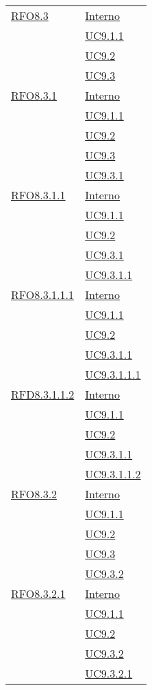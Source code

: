 \begin{longtable}{|>{\centering}m{5cm}|m{5cm}<{\centering}|}
\hyperlink{RFO8.3}{RFO8.3} & \hyperlink{Interno}{Interno}\\
& \hyperref[UC9.1.1]{UC9.1.1}\\
& \hyperref[UC9.2]{UC9.2}\\
& \hyperref[UC9.3]{UC9.3}\\ \hline

\hyperlink{RFO8.3.1}{RFO8.3.1} & \hyperlink{Interno}{Interno}\\
& \hyperref[UC9.1.1]{UC9.1.1}\\
& \hyperref[UC9.2]{UC9.2}\\
& \hyperref[UC9.3]{UC9.3}\\
& \hyperref[UC9.3.1]{UC9.3.1}\\ \hline

\hyperlink{RFO8.3.1.1}{RFO8.3.1.1} & \hyperlink{Interno}{Interno}\\
& \hyperref[UC9.1.1]{UC9.1.1}\\
& \hyperref[UC9.2]{UC9.2}\\
& \hyperref[UC9.3.1]{UC9.3.1}\\
& \hyperref[UC9.3.1.1]{UC9.3.1.1}\\ \hline

\hyperlink{RFO8.3.1.1.1}{RFO8.3.1.1.1} & \hyperlink{Interno}{Interno}\\
& \hyperref[UC9.1.1]{UC9.1.1}\\
& \hyperref[UC9.2]{UC9.2}\\
& \hyperref[UC9.3.1.1]{UC9.3.1.1}\\
& \hyperref[UC9.3.1.1.1]{UC9.3.1.1.1}\\ \hline

\hyperlink{RFD8.3.1.1.2}{RFD8.3.1.1.2} & \hyperlink{Interno}{Interno}\\
& \hyperref[UC9.1.1]{UC9.1.1}\\
& \hyperref[UC9.2]{UC9.2}\\
& \hyperref[UC9.3.1.1]{UC9.3.1.1}\\
& \hyperref[UC9.3.1.1.2]{UC9.3.1.1.2}\\ \hline

\hyperlink{RFO8.3.2}{RFO8.3.2} & \hyperlink{Interno}{Interno}\\
& \hyperref[UC9.1.1]{UC9.1.1}\\
& \hyperref[UC9.2]{UC9.2}\\
& \hyperref[UC9.3]{UC9.3}\\
& \hyperref[UC9.3.2]{UC9.3.2}\\ \hline

\hyperlink{RFO8.3.2.1}{RFO8.3.2.1} & \hyperlink{Interno}{Interno}\\
& \hyperref[UC9.1.1]{UC9.1.1}\\
& \hyperref[UC9.2]{UC9.2}\\
& \hyperref[UC9.3.2]{UC9.3.2}\\
& \hyperref[UC9.3.2.1]{UC9.3.2.1}\\ \hline


\end{longtable}
